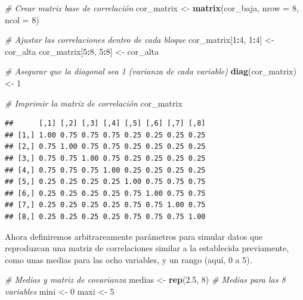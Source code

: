 \documentclass[
]{book}
\newenvironment{Shaded}{\begin{snugshade}}{\end{snugshade}}
\newcommand{\AttributeTok}[1]{\textcolor[rgb]{0.13,0.29,0.53}{#1}}
\newcommand{\CommentTok}[1]{\textcolor[rgb]{0.56,0.35,0.01}{\textit{#1}}}
\newcommand{\DecValTok}[1]{\textcolor[rgb]{0.00,0.00,0.81}{#1}}
\newcommand{\FloatTok}[1]{\textcolor[rgb]{0.00,0.00,0.81}{#1}}
\newcommand{\FunctionTok}[1]{\textcolor[rgb]{0.13,0.29,0.53}{\textbf{#1}}}
\newcommand{\NormalTok}[1]{#1}
\newcommand{\OtherTok}[1]{\textcolor[rgb]{0.56,0.35,0.01}{#1}}
\newcommand{\SpecialCharTok}[1]{\textcolor[rgb]{0.81,0.36,0.00}{\textbf{#1}}}
\begin{document}
\begin{Shaded}
\begin{Highlighting}[]
\CommentTok{\# Crear matriz base de correlación}
\NormalTok{cor\_matrix }\OtherTok{\textless{}{-}} \FunctionTok{matrix}\NormalTok{(cor\_baja, }\AttributeTok{nrow =} \DecValTok{8}\NormalTok{, }\AttributeTok{ncol =} \DecValTok{8}\NormalTok{)}

\CommentTok{\# Ajustar las correlaciones dentro de cada bloque}
\NormalTok{cor\_matrix[}\DecValTok{1}\SpecialCharTok{:}\DecValTok{4}\NormalTok{, }\DecValTok{1}\SpecialCharTok{:}\DecValTok{4}\NormalTok{] }\OtherTok{\textless{}{-}}\NormalTok{ cor\_alta}
\NormalTok{cor\_matrix[}\DecValTok{5}\SpecialCharTok{:}\DecValTok{8}\NormalTok{, }\DecValTok{5}\SpecialCharTok{:}\DecValTok{8}\NormalTok{] }\OtherTok{\textless{}{-}}\NormalTok{ cor\_alta}

\CommentTok{\# Asegurar que la diagonal sea 1 (varianza de cada variable)}
\FunctionTok{diag}\NormalTok{(cor\_matrix) }\OtherTok{\textless{}{-}} \DecValTok{1}

\CommentTok{\# Imprimir la matriz de correlación}
\NormalTok{cor\_matrix}
\end{Highlighting}
\end{Shaded}

\begin{verbatim}
##      [,1] [,2] [,3] [,4] [,5] [,6] [,7] [,8]
## [1,] 1.00 0.75 0.75 0.75 0.25 0.25 0.25 0.25
## [2,] 0.75 1.00 0.75 0.75 0.25 0.25 0.25 0.25
## [3,] 0.75 0.75 1.00 0.75 0.25 0.25 0.25 0.25
## [4,] 0.75 0.75 0.75 1.00 0.25 0.25 0.25 0.25
## [5,] 0.25 0.25 0.25 0.25 1.00 0.75 0.75 0.75
## [6,] 0.25 0.25 0.25 0.25 0.75 1.00 0.75 0.75
## [7,] 0.25 0.25 0.25 0.25 0.75 0.75 1.00 0.75
## [8,] 0.25 0.25 0.25 0.25 0.75 0.75 0.75 1.00
\end{verbatim}

Ahora definiremos arbitrareamente parámetros para simular datos que reproduzcan una matriz de correlaciones similar a la establecida previamente, como unas medias para las ocho variables, y un rango (aquí, 0 a 5).

\begin{Shaded}
\begin{Highlighting}[]
\CommentTok{\# Medias y matriz de covarianza}
\NormalTok{medias }\OtherTok{\textless{}{-}} \FunctionTok{rep}\NormalTok{(}\FloatTok{2.5}\NormalTok{, }\DecValTok{8}\NormalTok{)  }\CommentTok{\# Medias para las 8 variables}
\NormalTok{mini }\OtherTok{\textless{}{-}} \DecValTok{0}
\NormalTok{maxi }\OtherTok{\textless{}{-}} \DecValTok{5}
\end{Highlighting}
\end{Shaded}
\end{document}
